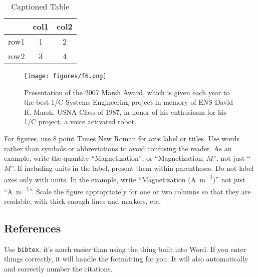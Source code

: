 \documentclass{wsecapstone}
\begin{document}
\begin{table}[hpt]
\caption{Captioned Table}
\label{t1}
\begin{center}
\begin{tabular}{lcc}
\toprule
 & col1 & col2 \\
\midrule
row1 & 1 & 2 \\
row2 & 3 & 4 \\
\bottomrule
\end{tabular}
\end{center}
\end{table}

\begin{figure}[hpb]
\begin{center}
\texttt{[image: figures/f6.png]}
\end{center}
\caption{Presentation of the 2007 Marsh Award, which is given each year to the best 1/C Systems Engineering project in memory of ENS David R.  Marsh, USNA Class of 1987, in honor of his enthusiasm for his 1/C project, a voice activated robot.}
\label{f6}
\end{figure}

For figures, use 8 point Times New Roman for axis label or titles. Use words rather than symbols or abbreviations to avoid confusing the reader. As an example, write the quantity ``Magnetization'', or ``Magnetization, $M$'', not just ``$M$''. If including units in the label, present them within parentheses. Do not label axes only with units. In the example, write ``Magnetization (\si{\ampere\per\meter})'' not just ``\si{\ampere\per\meter}''. Scale the figure appropriately for one or two columns so that they are readable, with thick enough lines and markers, etc. 

\subsection{References}
Use \lstinline{bibtex}, it's much easier than using the thing built into Word. If you enter things correctly, it will handle the formatting for you. It will also automatically and correctly number the citations. 
\end{document}
